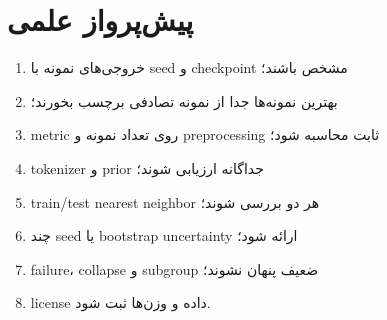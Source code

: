 \documentclass[12pt,openany,oneside]{book}
\begin{document}
\section{پیش‌پرواز علمی}
\begin{enumerate}
\item خروجی‌های نمونه با seed و checkpoint مشخص باشند؛
\item بهترین نمونه‌ها جدا از نمونه تصادفی برچسب بخورند؛
\item metric روی تعداد نمونه و preprocessing ثابت محاسبه شود؛
\item tokenizer و prior جداگانه ارزیابی شوند؛
\item train/test nearest neighbor هر دو بررسی شوند؛
\item چند seed یا bootstrap uncertainty ارائه شود؛
\item failure، collapse و subgroup ضعیف پنهان نشوند؛
\item license داده و وزن‌ها ثبت شود.
\end{enumerate}
\end{document}

